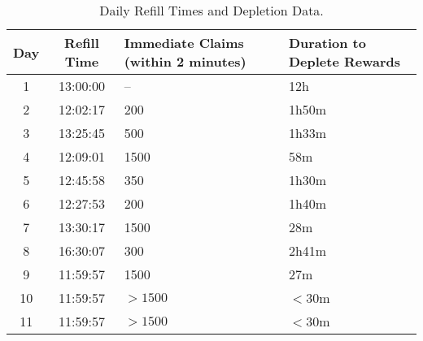 
\begin{table}[t]
    \centering


    \begin{tabular}{c | c | m{3.5cm} | m{3.5cm}}
    \hline
    \textbf{Day} & \textbf{Refill Time} & \textbf{Immediate Claims (within 2 minutes)} & \textbf{Duration to Deplete Rewards } \\
    \hline
    1  & 13:00:00 & --   & 12h    \\
    2  & 12:02:17 & 200  & 1h50m  \\
    3  & 13:25:45 & 500  & 1h33m  \\
    4  & 12:09:01 & 1500 & 58m    \\
    5  & 12:45:58 & 350  & 1h30m  \\
    6  & 12:27:53 & 200  & 1h40m  \\
    7  & 13:30:17 & 1500 & 28m    \\
    8  & 16:30:07 & 300  & 2h41m  \\
    9  & 11:59:57 & 1500 & 27m    \\
    10 & 11:59:57 & $>1500$ & $<30$m \\
    11 & 11:59:57 & $>1500$ & $<30$m \\
    \hline
    \end{tabular}
        \caption{Daily Refill Times and Depletion Data.\label{tab:claims}}
    \end{table}
    